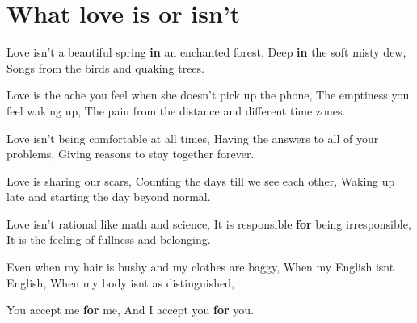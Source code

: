 \documentclass[
]{book}
\newenvironment{Shaded}{\begin{snugshade}}{\end{snugshade}}
\newcommand{\ControlFlowTok}[1]{\textcolor[rgb]{0.13,0.29,0.53}{\textbf{#1}}}
\newcommand{\NormalTok}[1]{#1}
\newcommand{\StringTok}[1]{\textcolor[rgb]{0.31,0.60,0.02}{#1}}
\begin{document}
\hypertarget{what-love-is-or-isnt}{%
\chapter{What love is or isn't}\label{what-love-is-or-isnt}}

\begin{Shaded}
\begin{Highlighting}[]

\NormalTok{Love isn’t a beautiful spring }\ControlFlowTok{in}\NormalTok{ an enchanted forest,}
\NormalTok{Deep }\ControlFlowTok{in}\NormalTok{ the soft misty dew,}
\NormalTok{Songs from the birds and quaking trees.}

\NormalTok{Love is the ache you feel when she doesn’t pick up the phone,}
\NormalTok{The emptiness you feel waking up,}
\NormalTok{The pain from the distance and different time zones.}

\NormalTok{Love isn’t being comfortable at all times,}
\NormalTok{Having the answers to all of your problems,}
\NormalTok{Giving reasons to stay together forever.}

\NormalTok{Love is sharing our scars,}
\NormalTok{Counting the days till we see each other,}
\NormalTok{Waking up late and starting the day beyond normal.}

\NormalTok{Love isn’t rational like math and science,}
\NormalTok{It is responsible }\ControlFlowTok{for}\NormalTok{ being irresponsible, }
\NormalTok{It is the feeling of fullness and belonging.}

\NormalTok{Even when my hair is bushy and my clothes are baggy,}
\NormalTok{When my English isn}\StringTok{\textquotesingle{}t English,}
\StringTok{When my body isn\textquotesingle{}}\NormalTok{t as distinguished,}

\NormalTok{You accept me }\ControlFlowTok{for}\NormalTok{ me,}
\NormalTok{And I accept you }\ControlFlowTok{for}\NormalTok{ you.}
\end{Highlighting}
\end{Shaded}
\end{document}
